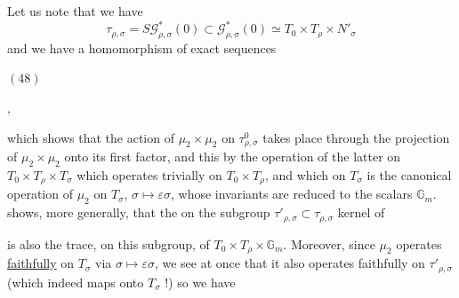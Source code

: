
Let us note that we have
\[
\tau_{\rho,\sigma}=S\mathcal G^*_{\rho,\sigma}(0)\subset\mathcal G^*_{\rho,\sigma}(0)\simeq T_0\times T_\rho\times N'_\sigma
\]
and we have a homomorphism of exact sequences

\begin{samepage}
\noindent$(48)$\quad
{}
\end{samepage},

which shows that the action of $\mu_2\times\mu_2$ on \deleted{$\unsure{\tau}$} $\tau^0_{\rho,\sigma}$ takes place through the projection of $\mu_2\times\mu_2$ onto its first factor, and this by the operation of the latter on $T_0\times T_\rho\times T_\sigma$ which operates trivially on $T_0\times T_\rho$, and which on $T_\sigma$ is the canonical operation of $\mu_2$ on $T_\sigma$, $\sigma\mapsto\varepsilon\sigma$, whose invariants are reduced to the scalars $\mathbb G_m$.   shows, more generally, that the   on the subgroup $\tau'_{\rho,\sigma}\subset\tau_{\rho,\sigma}$ kernel of


is also the trace, on this subgroup, of $T_0\times T_\rho\times\mathbb G_m$. Moreover, since $\mu_2$ operates \uline{faithfully} on $T_\sigma$ via $\sigma\mapsto\varepsilon\sigma$, we see  at once that it also operates faithfully on $\tau'_{\rho,\sigma}$ (which indeed maps \uline{} onto $T_\sigma$ !) so we have

